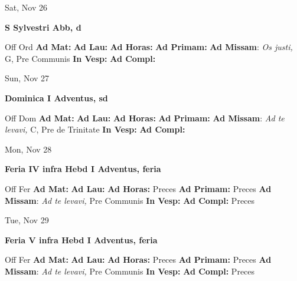 \documentclass[10pt]{article}
\begin{document}
\begin{minipage}{3.5in}
\vspace{2em}\begin{center}
Sat, Nov 26
\end{center}\textbf{ \large S Sylvestri Abb, \textnormal{\normalsize d}}
\begin{justify}
Off Ord
\textbf{Ad Mat: }
\textbf{Ad Lau: }
\textbf{Ad Horas: }
\textbf{Ad Primam: }
\textbf{Ad Missam}: \textit{Os justi,} G, Pre Communis
\textbf{In Vesp: }
\textbf{Ad Compl: }\end{justify}
\end{minipage}



\begin{minipage}{3.5in}
\vspace{2em}\begin{center}
Sun, Nov 27
\end{center}\textbf{ \large Dominica I Adventus, \textnormal{\normalsize sd}}
\begin{justify}
Off Dom
\textbf{Ad Mat: }
\textbf{Ad Lau: }
\textbf{Ad Horas: }
\textbf{Ad Primam: }
\textbf{Ad Missam}: \textit{Ad te levavi,} C, Pre de Trinitate
\textbf{In Vesp: }
\textbf{Ad Compl: }\end{justify}
\end{minipage}



\begin{minipage}{3.5in}
\vspace{2em}\begin{center}
Mon, Nov 28
\end{center}\textbf{ \large Feria IV infra Hebd I Adventus, \textnormal{\normalsize feria}}
\begin{justify}
Off Fer
\textbf{Ad Mat: }
\textbf{Ad Lau: }
\textbf{Ad Horas: }Preces
\textbf{Ad Primam: }Preces
\textbf{Ad Missam}: \textit{Ad te levavi,} Pre Communis
\textbf{In Vesp: }
\textbf{Ad Compl: }Preces\end{justify}
\end{minipage}



\begin{minipage}{3.5in}
\vspace{2em}\begin{center}
Tue, Nov 29
\end{center}\textbf{ \large Feria V infra Hebd I Adventus, \textnormal{\normalsize feria}}
\begin{justify}
Off Fer
\textbf{Ad Mat: }
\textbf{Ad Lau: }
\textbf{Ad Horas: }Preces
\textbf{Ad Primam: }Preces
\textbf{Ad Missam}: \textit{Ad te levavi,} Pre Communis
\textbf{In Vesp: }
\textbf{Ad Compl: }Preces\end{justify}
\end{minipage}
\end{document}
